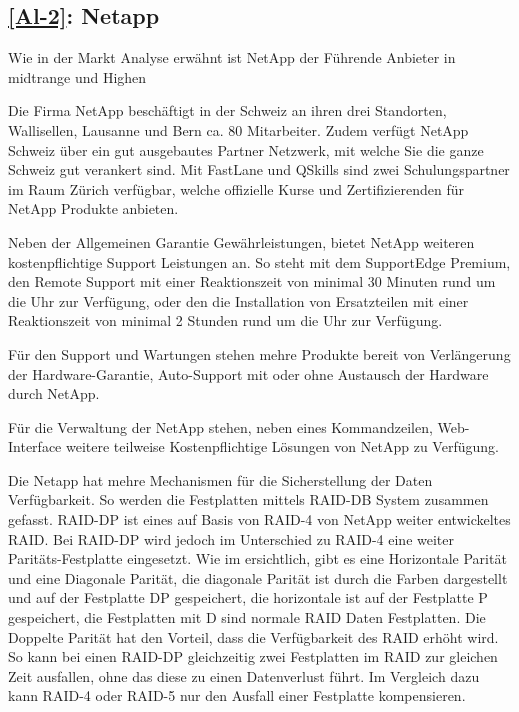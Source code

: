 \subsection{\ref{Al-2}: Netapp}

Wie in der Markt Analyse erwähnt ist NetApp der Führende Anbieter in midtrange und Highen

Die Firma NetApp beschäftigt in  der Schweiz an ihren drei Standorten, Wallisellen, Lausanne und Bern ca. 80 Mitarbeiter. Zudem verfügt NetApp Schweiz über ein gut ausgebautes Partner Netzwerk, mit welche Sie die ganze Schweiz gut verankert sind. Mit FastLane und QSkills sind zwei Schulungspartner im Raum Zürich verfügbar, welche offizielle Kurse und Zertifizierenden für NetApp Produkte anbieten. 

Neben der Allgemeinen Garantie Gewährleistungen, bietet NetApp weiteren kostenpflichtige Support Leistungen an. So steht mit dem SupportEdge Premium, den Remote Support mit einer Reaktionszeit von minimal 30 Minuten rund um die Uhr zur Verfügung, oder den die Installation von Ersatzteilen mit einer Reaktionszeit von minimal 2 Stunden rund um die Uhr zur Verfügung. 

Für den Support und Wartungen stehen mehre Produkte bereit von Verlängerung der Hardware-Garantie, Auto-Support mit oder ohne Austausch der Hardware durch NetApp.


Für die Verwaltung der NetApp stehen, neben eines Kommandzeilen, Web-Interface weitere teilweise Kostenpflichtige Lösungen von NetApp zu Verfügung. 

Die Netapp hat mehre Mechanismen für die Sicherstellung der Daten Verfügbarkeit. So werden die Festplatten mittels RAID-DB System zusammen gefasst. RAID-DP ist eines  auf Basis von RAID-4 von NetApp weiter entwickeltes RAID. Bei RAID-DP wird jedoch im Unterschied zu RAID-4 eine weiter Paritäts-Festplatte eingesetzt. Wie im  ersichtlich, gibt es eine Horizontale Parität und eine Diagonale Parität, die diagonale Parität ist durch die Farben dargestellt und auf der Festplatte DP gespeichert, die horizontale ist auf der Festplatte P gespeichert, die Festplatten mit D sind normale RAID Daten Festplatten. Die Doppelte Parität hat den Vorteil, dass die Verfügbarkeit des RAID erhöht wird. So kann bei einen RAID-DP gleichzeitig zwei Festplatten im RAID zur gleichen Zeit ausfallen, ohne das diese zu einen Datenverlust führt. Im Vergleich dazu kann RAID-4 oder RAID-5 nur den Ausfall einer Festplatte kompensieren.\cite{White2010}

